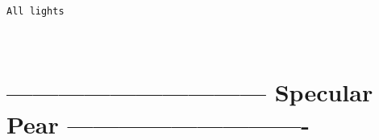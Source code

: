 \documentclass[11pt]{article}
\begin{document}
    \begin{Verbatim}[commandchars=\\\{\}]
All lights

    \end{Verbatim}

    \begin{center}
    \end{center}
    { \hspace*{\fill} \\}
    
    \hypertarget{specular-pear--}{%
\section{------------------------------ Specular Pear
----------------------------}\label{specular-pear--}}
\end{document}
